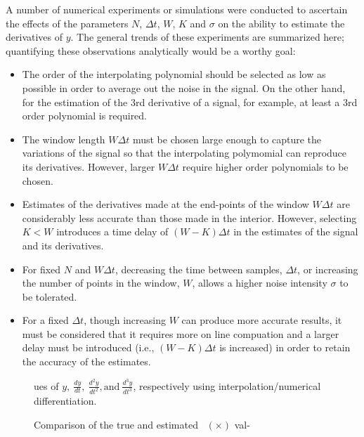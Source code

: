 A number of numerical experiments or simulations
were conducted to ascertain the effects of the
parameters $N$,  $\Delta t$, $W$, $K$ and $\sigma$ on the ability to 
estimate the derivatives
of $y$. 
The general trends of these experiments are summarized here; quantifying
these observations analytically would be a worthy goal:
\begin{itemize}

\item The order of the interpolating polynomial should be selected as low as 
possible in order to average out the noise in the signal. 
On the other hand, for the estimation of 
the 3rd derivative of a signal, for example, 
at least a 3rd order polynomial is required.

\item The window length $W \Delta t$ must be chosen large enough to
capture the variations of the signal so that the interpolating polymomial 
can reproduce its derivatives.  However, larger $W \Delta t$ require
higher order polynomials to be chosen.

\item Estimates of the derivatives made at the end-points of the window
$W \Delta t$ are considerably less accurate than those made in the interior.
However, selecting $K < W$ introduces a time delay of $(W-K) \Delta t$
in the estimates of the signal and its derivatives. 

\item For fixed $N$ and $W \Delta t$, decreasing the time between samples,
$\Delta t$, or increasing
the number of points in the window, $W$, allows a higher noise intensity
$\sigma$ to be tolerated.

\item For a fixed $\Delta t$, though increasing $W$ can produce more accurate results,
it must be considered that it requires more on line compuation and a larger
delay must be introduced (i.e., $(W-K)\Delta t$ is increased)
in order to retain the accuracy of the estimates. 

\end{itemize}

\begin{figure}[hbt]
\centerline{}
\smallskip
\small
\caption{\small Comparison of the true and estimated \ $(\times)$ val-} 
ues of $y, \ \frac{dy}{dt}, \ 
\frac{d^2y}{dt^2}, 
 \mbox{and} \
\frac{d^3y}{dt^3}$,  respectively using interpolation/numerical differentiation.
\label{figmplot10}
\end{figure}

